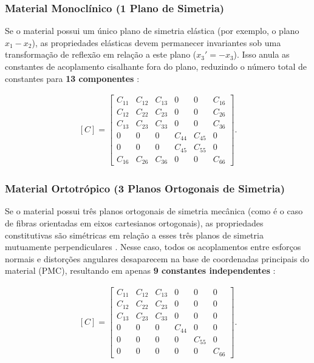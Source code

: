 \subsubsection{Material Monoclínico (1 Plano de Simetria)}
Se o material possui um único plano de simetria elástica (por exemplo, o plano $x_1 - x_2$), as propriedades elásticas devem permanecer invariantes sob uma transformação de reflexão em relação a este plano ($x_3' = -x_3$). Isso anula as constantes de acoplamento cisalhante fora do plano, reduzindo o número total de constantes para \textbf{13 componentes} \cite{RMJones2018}:

\begin{equation}
  \begin{aligned}
  [C] = \begin{bmatrix}
  C_{11} & C_{12} & C_{13} & 0 & 0 & C_{16} \\
  C_{12} & C_{22} & C_{23} & 0 & 0 & C_{26} \\
  C_{13} & C_{23} & C_{33} & 0 & 0 & C_{36} \\
  0 & 0 & 0 & C_{44} & C_{45} & 0 \\
  0 & 0 & 0 & C_{45} & C_{55} & 0 \\
  C_{16} & C_{26} & C_{36} & 0 & 0 & C_{66}
\end{bmatrix}.
  \end{aligned}
  \label{eq:monoclinic_stiffness}
\end{equation}

\subsubsection{Material Ortotrópico (3 Planos Ortogonais de Simetria)}
Se o material possui três planos ortogonais de simetria mecânica (como é o caso de fibras orientadas em eixos cartesianos ortogonais), as propriedades constitutivas são simétricas em relação a esses três planos de simetria mutuamente perpendiculares \cite{Sadd2009}. Nesse caso, todos os acoplamentos entre esforços normais e distorções angulares desaparecem na base de coordenadas principais do material (PMC), resultando em apenas \textbf{9 constantes independentes} \cite{Sadd2009}:

\begin{equation}
  \begin{aligned}
  [C] = \begin{bmatrix}
  C_{11} & C_{12} & C_{13} & 0 & 0 & 0 \\
  C_{12} & C_{22} & C_{23} & 0 & 0 & 0 \\
  C_{13} & C_{23} & C_{33} & 0 & 0 & 0 \\
  0 & 0 & 0 & C_{44} & 0 & 0 \\
  0 & 0 & 0 & 0 & C_{55} & 0 \\
  0 & 0 & 0 & 0 & 0 & C_{66}
\end{bmatrix}.
  \end{aligned}
  \label{eq:orthotropic_stiffness}
\end{equation}

